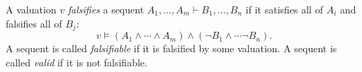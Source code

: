 

\setcounter{section}{2}
\setcounter{subsection}{4}
\setcounter{dfn}{7}

\begin{dfn}
\label{dfn:FalsifySequent}
A valuation $v$ \emph{falsifies} a sequent $A_1, \ldots, A_m \vdash B_1, \ldots, B_n$ if it satisfies all of $A_i$ and falsifies all of $B_j$:
\[
v \vDash (A_1 \wedge \cdots \wedge A_m) \wedge (\neg B_1 \wedge \cdots \neg B_n).
\]
A sequent is called \emph{falsifiable} if it is falsified by some valuation.
A sequent is called \emph{valid} if it is not falsifiable.
\end{dfn}


